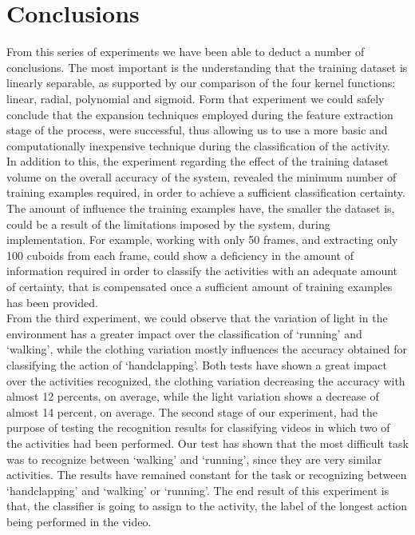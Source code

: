 \documentclass[11pt]{report}
\begin{document}
\section{Conclusions}
From this series of experiments we have been able to deduct a number of conclusions. The most important is the understanding that the training dataset is linearly separable, as supported by our comparison of the four kernel functions: linear, radial, polynomial and sigmoid. Form that experiment we could safely conclude that the expansion techniques employed during the feature extraction stage of the process, were successful, thus allowing us to use a more basic and computationally inexpensive technique during the classification of the activity. \\
In addition to this, the experiment regarding the effect of the training dataset volume on the overall accuracy of the system, revealed the minimum number of training examples required, in order to achieve a sufficient classification certainty. The amount of influence the training examples have, the smaller the dataset is, could be a result of the limitations imposed by the system, during implementation. For example, working with only 50 frames, and extracting only 100 cuboids from each frame, could show a deficiency in the amount of information required in order to classify the activities with an adequate amount of certainty, that is compensated once a sufficient amount of training examples has been provided. \\
From the third experiment, we could observe that the variation of light in the environment has a greater impact over the classification of `running' and `walking', while the clothing variation mostly influences the accuracy obtained for classifying the action of `handclapping'. Both tests have shown a great impact over the activities recognized, the clothing variation decreasing the accuracy with almost 12 percents, on average, while the light variation shows a decrease of  almost 14 percent, on average. The second stage of our experiment, had the purpose of testing the recognition results for classifying videos in which two of the activities had been performed. Our test has shown that the most difficult task was to recognize between `walking' and `running', since they are very similar activities. The results have remained constant for the task or recognizing between `handclapping' and `walking' or `running'. The end result of this experiment is that, the classifier is going to assign to the activity, the label of the longest action being performed in the video. \\
\end{document}
